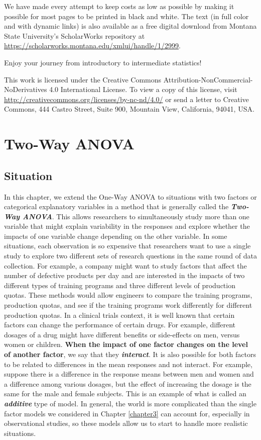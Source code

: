 \documentclass[]{book}
\theoremstyle{definition}
\theoremstyle{definition}
\theoremstyle{remark}
\begin{document}
We have made every attempt to keep costs as low as possible by making it
possible for most pages to be printed in black and white. The text (in
full color and with dynamic links) is also available as a free digital
download from Montana State University's ScholarWorks repository at
\url{https://scholarworks.montana.edu/xmlui/handle/1/2999}.

Enjoy your journey from introductory to intermediate statistics!

This work is licensed under the Creative Commons
Attribution-NonCommercial-NoDerivatives 4.0 International License. To
view a copy of this license, visit
\url{http://creativecommons.org/licenses/by-nc-nd/4.0/} or send a letter
to Creative Commons, 444 Castro Street, Suite 900, Mountain View,
California, 94041, USA.

\chapter{Two-Way ANOVA}\label{chapter4}

\section{Situation}\label{section4-1}

In this chapter, we extend the One-Way ANOVA to situations with two
factors or categorical explanatory variables in a method that is
generally called the \textbf{\emph{Two-Way ANOVA}}. This allows
researchers to simultaneously study more than one variable that might
explain variability in the responses and explore whether the impacts of
one variable change depending on the other variable. In some situations,
each observation is so expensive that researchers want to use a single
study to explore two different sets of research questions in the same
round of data collection. For example, a company might want to study
factors that affect the number of defective products per day and are
interested in the impacts of two different types of training programs
and three different levels of production quotas. These methods would
allow engineers to compare the training programs, production quotas, and
see if the training programs work differently for different production
quotas. In a clinical trials context, it is well known that certain
factors can change the performance of certain drugs. For example,
different dosages of a drug might have different benefits or
side-effects on men, versus women or children. \textbf{When the impact
of one factor changes on the level of another factor}, we say that they
\textbf{\emph{interact}}. It is also possible for both factors to be
related to differences in the mean responses and not interact. For
example, suppose there is a difference in the response means between men
and women and a difference among various dosages, but the effect of
increasing the dosage is the same for the male and female subjects. This
is an example of what is called an \textbf{\emph{additive}} type of
model. In general, the world is more complicated than the single factor
models we considered in Chapter \ref{chapter3} can account for,
especially in observational studies, so these models allow us to start
to handle more realistic situations.
\end{document}
